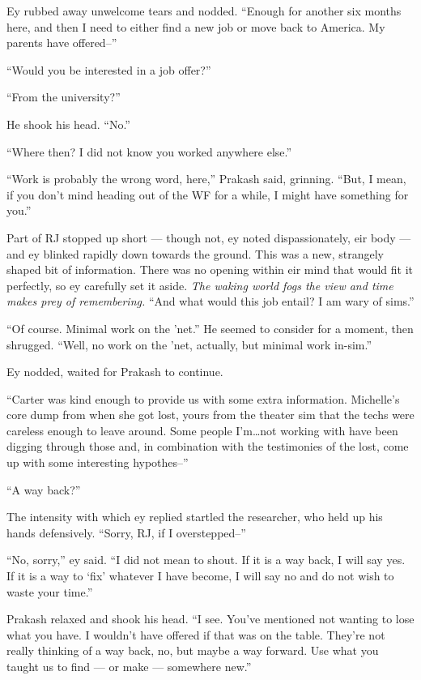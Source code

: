 Ey rubbed away unwelcome tears and nodded. ``Enough for another six months here, and then I need to either find a new job or move back to America. My parents have offered--''

``Would you be interested in a job offer?''

``From the university?''

He shook his head. ``No.''

``Where then? I did not know you worked anywhere else.''

``Work is probably the wrong word, here,'' Prakash said, grinning. ``But, I mean, if you don't mind heading out of the WF for a while, I might have something for you.''

Part of RJ stopped up short — though not, ey noted dispassionately, eir body — and ey blinked rapidly down towards the ground. This was a new, strangely shaped bit of information. There was no opening within eir mind that would fit it perfectly, so ey carefully set it aside. \emph{The waking world fogs the view and time makes prey of remembering.} ``And what would this job entail? I am wary of sims.''

``Of course. Minimal work on the 'net.'' He seemed to consider for a moment, then shrugged. ``Well, no work on the 'net, actually, but minimal work in-sim.''

Ey nodded, waited for Prakash to continue.

``Carter was kind enough to provide us with some extra information. Michelle's core dump from when she got lost, yours from the theater sim that the techs were careless enough to leave around. Some people I'm\ldots not working with have been digging through those and, in combination with the testimonies of the lost, come up with some interesting hypothes--''

``A way back?''

The intensity with which ey replied startled the researcher, who held up his hands defensively. ``Sorry, RJ, if I overstepped--''

``No, sorry,'' ey said. ``I did not mean to shout. If it is a way back, I will say yes. If it is a way to `fix' whatever I have become, I will say no and do not wish to waste your time.''

Prakash relaxed and shook his head. ``I see. You've mentioned not wanting to lose what you have. I wouldn't have offered if that was on the table. They're not really thinking of a way back, no, but maybe a way forward. Use what you taught us to find — or make — somewhere new.''

